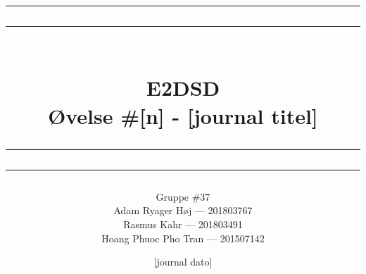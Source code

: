\documentclass[12pt,a4paper]{article}
\newcommand\mymaketitle[1]{
   \rule{\textwidth}{1.6pt}\vspace*{-\baselineskip}\vspace*{2pt}
   \rule{\textwidth}{0.4pt}
   \\   
   \huge \bf #1\\
   \vspace{-8pt}
   \rule{\textwidth}{0.4pt}\vspace*{-\baselineskip}\vspace{3.2pt}
   \rule{\textwidth}{1.6pt}
}
\begin{document}
\title{
	\mymaketitle{E2DSD\\Øvelse \#[n] - [journal titel]} %
}
\author{
	Gruppe \#37\\
	Adam Ryager Høj --- 201803767\\
   Rasmus Kahr --- 201803491\\
   Hoang Phuoc Pho Tran --- 201507142
}
\date{[journal dato]} %

\maketitle
\clearpage

\tableofcontents
\clearpage

\end{document}
